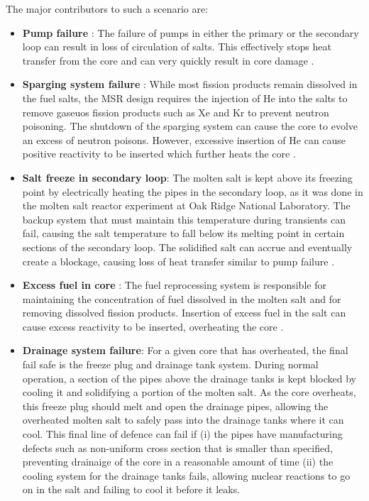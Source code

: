\documentclass[12pt]{article}
\begin{document}
The major contributors to such a scenario are:

\begin{itemize}

\item \textbf{Pump failure} : The failure of pumps in either the primary or the secondary loop can result in loss of circulation of salts. This effectively stops heat transfer from the core and can very quickly result in core damage \cite{elsheikh_safety_2013} \cite{yoshioka_guidelines_2012} .

\item \textbf{Sparging system failure} : While most fission products remain dissolved in the fuel salts, the MSR design requires the injection of He into the salts to remove gaseuos fission products such as Xe and Kr to prevent neutron poisoning. The shutdown of the sparging system can cause the core to evolve an excess of neutron poisons. However, excessive insertion of He can cause positive reactivity to be inserted which further heats the core \cite{yoshioka_guidelines_2012} \cite{moir_recommendations_2008}.

\item \textbf{Salt freeze in secondary loop}: The molten salt is kept above its freezing point by electrically heating the pipes in the secondary loop, as it was done in the molten salt reactor experiment at Oak Ridge National Laboratory. The backup system that must maintain this temperature during transients can fail, causing the salt temperature to fall below its melting point in certain sections of the secondary loop. The solidified salt can accrue and eventually create a blockage, causing loss of heat transfer similar to pump failure \cite{haubenreich_experience_1970}.

\item \textbf{Excess fuel in core} : The fuel reprocessing system is responsible for maintaining the concentration of fuel dissolved in the molten salt and for removing dissolved fission products. Insertion of excess fuel in the salt can cause excess reactivity to be inserted, overheating the core \cite{haubenreich_experience_1970}.

\item \textbf{Drainage system failure}: For a given core that has overheated, the final fail safe is the freeze plug and drainage tank system. During normal operation, a section of the pipes above the drainage tanks is kept blocked by cooling it and solidifying a portion of the molten salt. As the core overheats, this freeze plug should melt and open the drainage pipes, allowing the overheated molten salt to safely pass into the drainage tanks where it can cool. This final line of defence can fail if (i) the pipes have manufacturing defects such as non-uniform cross section that is smaller than specified, preventing drainaige of the core in a reasonable amount of time (ii) the cooling system for the drainage tanks fails, allowing nuclear reactions to go on in the salt and failing to cool it before it leaks\cite{elsheikh_safety_2013}.


\end{itemize}
\end{document}
